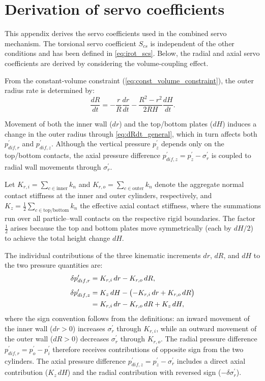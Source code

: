 \section{Derivation of servo coefficients}
\label{sec:appendix_servo}

This appendix derives the servo coefficients used in the combined servo mechanism. The torsional servo coefficient $S_{cs}$ is independent of the other conditions and has been defined in \cref{eq:irot_scs}. Below, the radial and axial servo coefficients are derived by considering the volume-coupling effect.

From the constant-volume constraint (\cref{eq:const_volume_constraint}), the outer radius rate is determined by:
\begin{equation}
\frac{dR}{dt} = -\frac{r}{R}\frac{dr}{dt} - \frac{R^2-r^2}{2RH}\frac{dH}{dt}.
\label{eq:dRdt_general}
\end{equation}

Movement of both the inner wall ($dr$) and the top/bottom plates ($dH$) induces a change in the outer radius through \cref{eq:dRdt_general}, which in turn affects both $p_{dif,r}^{\prime}$ and $p_{dif,z}^{\prime}$. Although the vertical pressure $p_z^{\prime}$ depends only on the top/bottom contacts, the axial pressure difference $p_{dif,z}^{\prime}=p_z^{\prime}-\sigma_r^{\prime}$ is coupled to radial wall movements through $\sigma_r^{\prime}$.

Let $K_{r,i}=\sum_{c\in\mathrm{inner}} k_n$ and $K_{r,o}=\sum_{c\in\mathrm{outer}} k_n$ denote the aggregate normal contact stiffness at the inner and outer cylinders, respectively, and $K_z=\frac{1}{2}\sum_{c\in\mathrm{top/bottom}} k_n$ the effective axial contact stiffness, where the summations run over all particle--wall contacts on the respective rigid boundaries. The factor $\frac{1}{2}$ arises because the top and bottom plates move symmetrically (each by $dH/2$) to achieve the total height change $dH$.

The individual contributions of the three kinematic increments $dr$, $dR$, and $dH$ to the two pressure quantities are:
\begin{align}
\delta p_{dif,r}^{\prime} &= K_{r,i}\,dr - K_{r,o}\,dR, \label{eq:dp_r_three}\\[4pt]
\delta p_{dif,z}^{\prime} &= K_z\,dH - \bigl(-K_{r,i}\,dr + K_{r,o}\,dR\bigr) \notag\\
                          &= K_{r,i}\,dr - K_{r,o}\,dR + K_z\,dH, \label{eq:dp_z_three}
\end{align}
where the sign convention follows from the definitions: an inward movement of the inner wall ($dr > 0$) increases $\sigma_r^{\prime}$ through $K_{r,i}$, while an outward movement of the outer wall ($dR > 0$) decreases $\sigma_r^{\prime}$ through $K_{r,o}$. The radial pressure difference $p_{dif,r}^{\prime} = p_o^{\prime} - p_i^{\prime}$ therefore receives contributions of opposite sign from the two cylinders. The axial pressure difference $p_{dif,z}^{\prime} = p_z^{\prime} - \sigma_r^{\prime}$ includes a direct axial contribution ($K_z\,dH$) and the radial contribution with reversed sign ($-\delta\sigma_r^{\prime}$).


